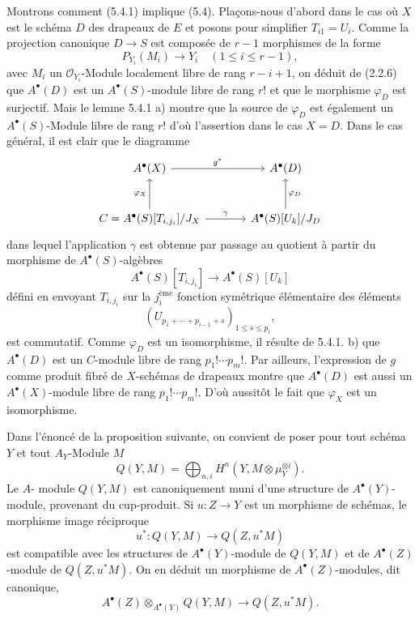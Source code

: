 \documentclass[11pt]{article}
\begin{document}
Montrons comment (5.4.1) implique (5.4). Plaçons-nous d'abord dans le cas 
où $X$ est le
schéma $D$ des drapeaux de $E$ et posons pour simplifier $T_{i1}=U_i$. Comme la projection canonique $D\to S$ est composée de $r-1$ morphismes de la forme
\[
P_{Y_i}(M_i)\to Y_i\quad(1\le i\le r-1),
\]
avec $M_i$ un $\mathcal O_{Y_i}$-Module localement libre de rang $r-i+1$, on déduit de (2.2.6) que $A^{\bullet}(D)$ est un $A^{\bullet}(S)$-module libre de rang $r!$ et que le morphisme $\varphi_D$ est surjectif. Mais le lemme 5.4.1 a) montre que la source de $\varphi_D$ est également un $A^{\bullet}(S)$-Module libre de rang $r!$ d'où l'assertion dans le cas $X=D$. Dans le cas général, il est clair que le diagramme
\[
\begin{tikzcd}[column sep=large,row sep=large]
A^{\bullet}(X) \arrow[r,"g^*"] & A^{\bullet}(D)\\
C=A^{\bullet}(S)[T_{i,j_i}]/J_X \arrow[u,"\varphi_X"] \arrow[r,"\gamma"] &
A^{\bullet}(S)[U_k]/J_D \arrow[u,"\varphi_D"']
\end{tikzcd}
\]
dans lequel l'application $\gamma$ est obtenue par passage au quotient à partir du morphisme de $A^{\bullet}(S)$-algèbres
\[
A^\bullet(S)[T_{i,j_i}]\to A^\bullet(S)[U_k]
\]
défini en envoyant $T_{i,j_i}$ sur la $j_i^{\text{ème}}$ fonction symétrique élémentaire des éléments
\[
(U_{p_1+\cdots+p_{i-1}+s})_{1\le s\le p_i},
\]
est commutatif. Comme $\varphi_D$ est un isomorphisme, il résulte de 5.4.1. b) que $A^{\bullet}(D)$ est un $C$-module libre de rang $p_1!\cdots p_m!$. Par ailleurs, l'expression de $g$ comme produit fibré de $X$-schémas de drapeaux montre que $A^{\bullet}(D)$ est aussi un $A^{\bullet}(X)$-module libre de rang $p_1!\cdots p_m!$. D'où aussitôt le fait que $\varphi_X$ est un isomorphisme.

Dans l'énoncé de la proposition suivante, on convient de poser pour tout schéma $Y$ et tout $A_Y$-Module $M$
\[
Q(Y,M)=\bigoplus_{n,i}H^n(Y,M\otimes\mu_Y^{\otimes i}).
\]
Le $A$-
module $Q(Y,M)$ est canoniquement muni d'une structure de $A^\bullet(Y)$-module, provenant du cup-produit. Si $u:Z\to Y$ est un morphisme de schémas, le morphisme image réciproque
\[
u^*:Q(Y,M)\to Q(Z,u^*M)
\]
est compatible avec les structures de $A^\bullet(Y)$-module de $Q(Y,M)$ et de $A^\bullet(Z)$-module de $Q(Z,u^*M)$. On en déduit un morphisme de $A^\bullet(Z)$-modules, dit canonique,
\[
A^\bullet(Z)\otimes_{A^\bullet(Y)}Q(Y,M)\to Q(Z,u^*M).
\]
\end{document}
